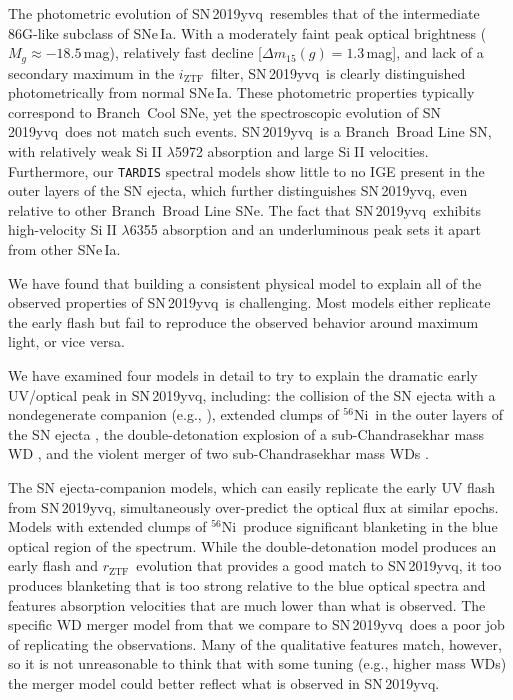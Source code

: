 \documentclass[twocolumn]{aastex63}
\def\ion#1#2{#1$\;${\footnotesize\rm{#2}}\relax}
\newcommand{\rztf}{$r_\mathrm{ZTF}$}
\newcommand{\iztf}{$i_\mathrm{ZTF}$}
\newcommand{\radni}{$^{56}$Ni}
\newcommand{\sn}{SN\,2019yvq}
\begin{document}
The photometric evolution of \sn\ resembles that of the intermediate 86G-like
subclass of SNe\,Ia. With a moderately faint peak optical brightness ($M_g
\approx -18.5$\,mag), relatively fast decline [$\Delta m_{15}(g) = 1.3$\,mag],
and lack of a secondary maximum in the \iztf\ filter, \sn\ is clearly
distinguished photometrically from normal SNe\,Ia. These photometric
properties typically correspond to Branch\ Cool SNe, yet the spectroscopic
evolution of \sn\ does not match such events. \sn\ is a Branch\ Broad Line SN,
with relatively weak \ion{Si}{II} $\lambda$5972 absorption and large
\ion{Si}{II} velocities. Furthermore, our \texttt{TARDIS} spectral models show
little to no IGE present in the outer layers of the SN ejecta, which further
distinguishes \sn, even relative to other Branch~Broad Line SNe. The fact that
\sn\ exhibits high-velocity \ion{Si}{II} $\lambda$6355 absorption and an
underluminous peak sets it apart from other SNe\,Ia.

We have found that building a consistent physical model to explain all of the
observed properties of \sn\ is challenging. Most models either replicate the
early flash but fail to reproduce the observed behavior around maximum light,
or vice versa.

We have examined four models in detail to try to explain the dramatic early
UV/optical peak in \sn, including: the collision of the SN ejecta with a
nondegenerate companion (e.g., \citealt{Kasen10a}), extended clumps of \radni\
in the outer layers of the SN ejecta \citep[e.g.,][]{Magee20a}, the
double-detonation explosion of a sub-Chandrasekhar mass WD
\citep[e.g.,][]{Polin19}, and the violent merger of two sub-Chandrasekhar mass
WDs \citep[e.g.,][]{Kromer16}.

The SN ejecta-companion models, which can easily replicate the early UV flash
from \sn, simultaneously over-predict the optical flux at similar epochs.
Models with extended clumps of \radni\ produce significant blanketing in the
blue optical region of the spectrum. While the double-detonation model
produces an early flash and \rztf\ evolution that provides a good match to
\sn, it too produces blanketing that is too strong relative to the blue
optical spectra and features absorption velocities that are much lower than
what is observed. The specific WD merger model from \citet{Kromer16} that we
compare to \sn\ does a poor job of replicating the observations. Many of the
qualitative features match, however, so it is not unreasonable to think that
with some tuning (e.g., higher mass WDs) the merger model could better reflect
what is observed in \sn.
\end{document}
